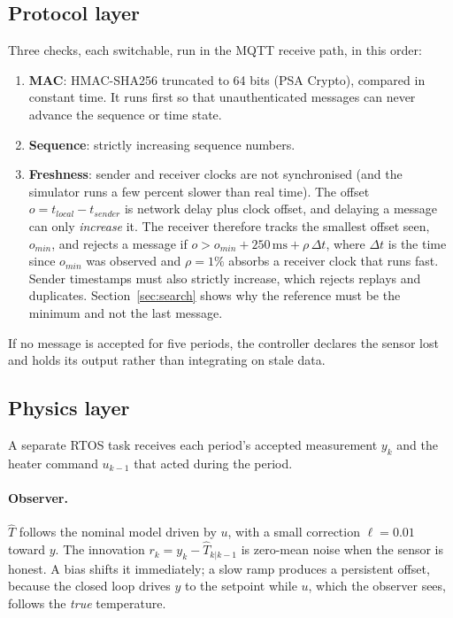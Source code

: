 \documentclass[10pt,twocolumn]{article}
\begin{document}
\subsection{Protocol layer}
Three checks, each switchable, run in the MQTT receive path, in this order:
\begin{enumerate}
  \item \textbf{MAC}: HMAC-SHA256 truncated to 64 bits (PSA Crypto), compared in
        constant time. It runs first so that unauthenticated messages can never
        advance the sequence or time state.
  \item \textbf{Sequence}: strictly increasing sequence numbers.
  \item \textbf{Freshness}: sender and receiver clocks are not synchronised (and
        the simulator runs a few percent slower than real time). The offset
        $o = t_{local} - t_{sender}$ is network delay plus clock offset, and
        delaying a message can only \emph{increase} it. The receiver therefore
        tracks the smallest offset seen, $o_{min}$, and rejects a message if
        $o > o_{min} + 250\,\text{ms} + \rho\,\Delta t$, where $\Delta t$ is the
        time since $o_{min}$ was observed and $\rho=1\%$ absorbs a receiver clock
        that runs fast. Sender timestamps must also strictly increase, which
        rejects replays and duplicates. Section~\ref{sec:search} shows why the
        reference must be the minimum and not the last message.
\end{enumerate}
If no message is accepted for five periods, the controller declares the sensor
lost and holds its output rather than integrating on stale data.

\subsection{Physics layer}
A separate RTOS task receives each period's accepted measurement $y_k$ and the
heater command $u_{k-1}$ that acted during the period.
\paragraph{Observer.} $\hat T$ follows the nominal model driven by $u$, with a
small correction $\ell=0.01$ toward $y$. The innovation
$r_k = y_k - \hat T_{k|k-1}$ is zero-mean noise when the sensor is honest. A bias
shifts it immediately; a slow ramp produces a persistent offset, because the
closed loop drives $y$ to the setpoint while $u$, which the observer sees,
follows the \emph{true} temperature.
\end{document}
